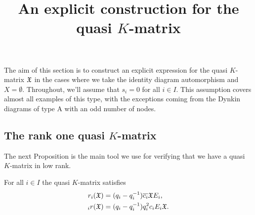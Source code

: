 \documentclass[a4 paper, 10pt]{article}
\begin{document}
\title{An explicit construction for the quasi $K$-matrix}
\date{}
\maketitle





The aim of this section is to construct an explicit expression for the quasi $K$-matrix $\mathfrak{X}$ in the cases where we take the identity diagram automorphism and $X = \emptyset$. Throughout, we'll assume that $s_i = 0$ for all $i \in I$. This assumption covers almost all examples of this type, with the exceptions coming from the Dynkin diagrams of type A with an odd number of nodes. 


\subsection{The rank one quasi $K$-matrix}

The next Proposition is the main tool we use for verifying that we have a quasi $K$-matrix in low rank.

\begin{proposition} \label{QKmskew}
	For all $i \in I$ the quasi $K$-matrix satisfies
		\begin{align}
			r_{i}(\mathfrak{X}) &= (q_i - q_i^{-1}) \overline{c_i} \mathfrak{X} E_i, \label{eq:riQkm}\\
			{}_{i}r(\mathfrak{X}) &= (q_i - q_i^{-1}) q_i^2c_iE_i \mathfrak{X}.  \label{eq:irQkm}
		\end{align}
\end{proposition} 
\end{document}
